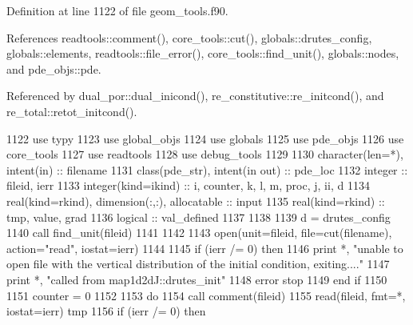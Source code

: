 Definition at line 1122 of file geom\+\_\+tools.\+f90.



References readtools\+::comment(), core\+\_\+tools\+::cut(), globals\+::drutes\+\_\+config, globals\+::elements, readtools\+::file\+\_\+error(), core\+\_\+tools\+::find\+\_\+unit(), globals\+::nodes, and pde\+\_\+objs\+::pde.



Referenced by dual\+\_\+por\+::dual\+\_\+inicond(), re\+\_\+constitutive\+::re\+\_\+initcond(), and re\+\_\+total\+::retot\+\_\+initcond().


\begin{DoxyCode}
1122       \textcolor{keywordtype}{use }typy
1123       \textcolor{keywordtype}{use }global_objs
1124       \textcolor{keywordtype}{use }globals
1125       \textcolor{keywordtype}{use }pde_objs
1126       \textcolor{keywordtype}{use }core_tools
1127       \textcolor{keywordtype}{use }readtools
1128       \textcolor{keywordtype}{use }debug_tools
1129       
1130       \textcolor{keywordtype}{character(len=*)}, \textcolor{keywordtype}{intent(in)} :: filename
1131       \textcolor{keywordtype}{class}(pde_str), \textcolor{keywordtype}{intent(in out)} :: pde\_loc
1132       \textcolor{keywordtype}{integer} :: fileid, ierr
1133       \textcolor{keywordtype}{integer(kind=ikind)} :: i, counter, k, l, m, proc, j, ii, d
1134       \textcolor{keywordtype}{real(kind=rkind)}, \textcolor{keywordtype}{dimension(:,:)}, \textcolor{keywordtype}{allocatable} :: input
1135       \textcolor{keywordtype}{real(kind=rkind)} :: tmp, \textcolor{keywordtype}{value}, grad
1136       \textcolor{keywordtype}{logical} :: val\_defined
1137       
1138       
1139       d = drutes_config%
1140       \textcolor{keyword}{call }find_unit(fileid)
1141       
1142       
1143       \textcolor{keyword}{open}(unit=fileid, file=cut(filename), action=\textcolor{stringliteral}{"read"}, iostat=ierr)
1144       
1145       \textcolor{keywordflow}{if} (ierr /= 0) \textcolor{keywordflow}{then}
1146         print *, \textcolor{stringliteral}{"unable to open file with the vertical distribution of the initial condition, exiting...."}
1147         print *, \textcolor{stringliteral}{"called from map1d2dJ::drutes\_init"}
1148         error stop
1149 \textcolor{keywordflow}{      end if}
1150       
1151       counter = 0
1152       
1153       \textcolor{keywordflow}{do}
1154         \textcolor{keyword}{call }comment(fileid)
1155         \textcolor{keyword}{read}(fileid, fmt=*, iostat=ierr) tmp
1156         \textcolor{keywordflow}{if} (ierr /= 0) \textcolor{keywordflow}{then}

\end{DoxyCode}

